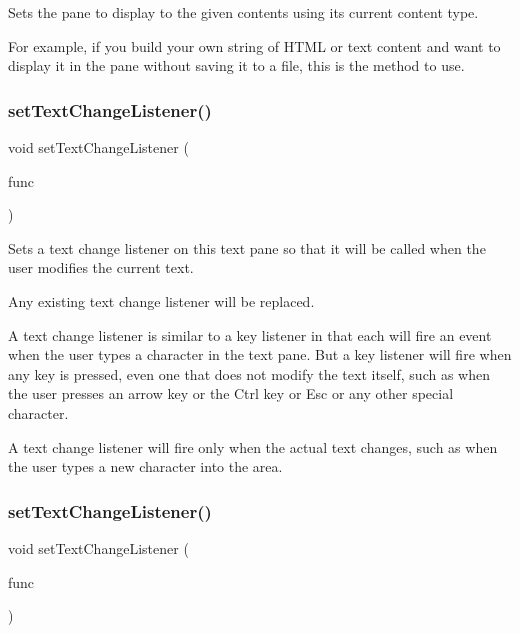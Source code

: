 Sets the pane to display to the given contents using its current content type. 

For example, if you build your own string of H\+T\+ML or text content and want to display it in the pane without saving it to a file, this is the method to use. \mbox{\label{classGBrowserPane_ae41284f9c540110180ac0ad6beca5cb0}} 
\subsubsection{\texorpdfstring{set\+Text\+Change\+Listener()}{setTextChangeListener()}\hspace{0.1cm}{\footnotesize\ttfamily [1/2]}}
{\footnotesize\ttfamily void set\+Text\+Change\+Listener (\begin{DoxyParamCaption}\item[{G\+Event\+Listener}]{func }\end{DoxyParamCaption})\hspace{0.3cm}{\ttfamily [virtual]}}



Sets a text change listener on this text pane so that it will be called when the user modifies the current text. 

Any existing text change listener will be replaced.

A text change listener is similar to a key listener in that each will fire an event when the user types a character in the text pane. But a key listener will fire when any key is pressed, even one that does not modify the text itself, such as when the user presses an arrow key or the Ctrl key or Esc or any other special character.

A text change listener will fire only when the actual text changes, such as when the user types a new character into the area. \mbox{\label{classGBrowserPane_ae8df75b0746951146d29220f386fcd33}} 
\subsubsection{\texorpdfstring{set\+Text\+Change\+Listener()}{setTextChangeListener()}\hspace{0.1cm}{\footnotesize\ttfamily [2/2]}}
{\footnotesize\ttfamily void set\+Text\+Change\+Listener (\begin{DoxyParamCaption}\item[{G\+Event\+Listener\+Void}]{func }\end{DoxyParamCaption})\hspace{0.3cm}{\ttfamily [virtual]}}



